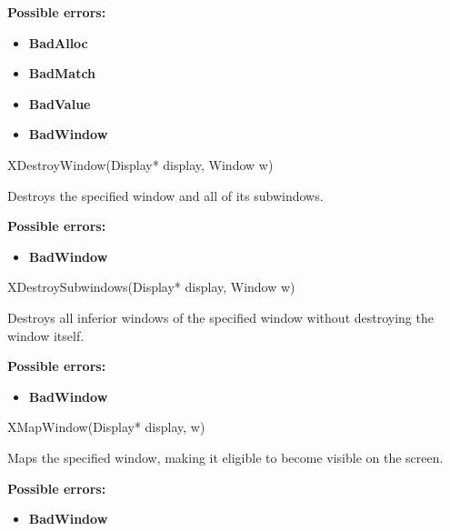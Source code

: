 \documentclass{report}
\begin{document}
\begin{itemize}
            \bigbreak \noindent
            \textbf{Possible errors:}
            \begin{itemize}
                \item \textbf{BadAlloc}
                \item \textbf{BadMatch}
                \item \textbf{BadValue}
                \item \textbf{BadWindow}
            \end{itemize}

            \begin{cppcode}
                XDestroyWindow(Display* display, Window w)
            \end{cppcode}
            \bigbreak \noindent
            Destroys the specified window and all of its subwindows.

            \bigbreak \noindent
            \textbf{Possible errors:}
            \begin{itemize}
                \item \textbf{BadWindow}
            \end{itemize}

            \begin{cppcode}
                XDestroySubwindows(Display* display, Window w) 
            \end{cppcode}
            \bigbreak \noindent
            Destroys all inferior windows of the specified window without destroying the window itself.

            \bigbreak \noindent
            \textbf{Possible errors:}
            \begin{itemize}
                \item \textbf{BadWindow}
            \end{itemize}

            \begin{cppcode}
                XMapWindow(Display* display, w)
            \end{cppcode}
            \bigbreak \noindent
            Maps the specified window, making it eligible to become visible on the screen.

            \bigbreak \noindent
            \textbf{Possible errors:}
            \begin{itemize}
                \item \textbf{BadWindow}
            \end{itemize}


\end{itemize}
\end{document}
